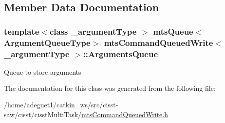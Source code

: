 \subsection{Member Data Documentation}
\hypertarget{classmts_command_queued_write_a863fbf2b7a850cdc9df55c9c55b5e4fd}{
\subsubsection[{Arguments\-Queue}]{\setlength{\rightskip}{0pt plus 5cm}template$<$class \-\_\-argument\-Type $>$ {\bf mts\-Queue}$<${\bf Argument\-Queue\-Type}$>$ {\bf mts\-Command\-Queued\-Write}$<$ \-\_\-argument\-Type $>$\-::Arguments\-Queue\hspace{0.3cm}{\ttfamily [protected]}}}\label{classmts_command_queued_write_a863fbf2b7a850cdc9df55c9c55b5e4fd}
Queue to store arguments 

The documentation for this class was generated from the following file\-:\begin{DoxyCompactItemize}
\item 
/home/adeguet1/catkin\-\_\-ws/src/cisst-\/saw/cisst/cisst\-Multi\-Task/\hyperlink{mts_command_queued_write_8h}{mts\-Command\-Queued\-Write.\-h}\end{DoxyCompactItemize}

